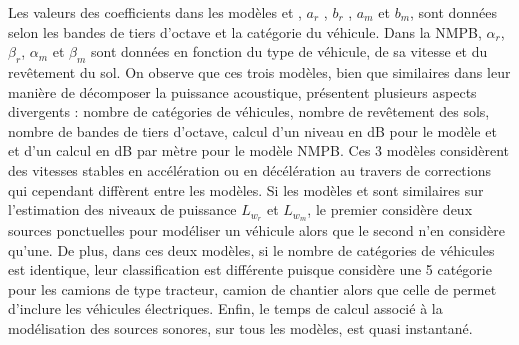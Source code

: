 Les valeurs des coefficients dans les modèles  et , $a_r$ ,  $b_r$ ,  $a_m$  et $b_m$,  sont données selon les bandes de tiers d'octave et la catégorie du véhicule. Dans la NMPB, $\alpha_r$, $\beta_r$, $\alpha_m$ et $\beta_m$ sont données en fonction du type de véhicule, de sa vitesse et du revêtement du sol.
On observe que ces trois modèles, bien que similaires dans leur manière de décomposer la puissance acoustique, présentent plusieurs aspects divergents : nombre de catégories de véhicules, nombre de revêtement des sols, nombre de bandes de tiers d'octave, calcul d'un niveau en dB pour le modèle  et  et d'un calcul en dB par mètre pour le modèle NMPB. Ces 3 modèles considèrent des vitesses stables en accélération ou en décélération au travers de corrections qui cependant diffèrent entre les modèles. Si les modèles  et  sont similaires sur l'estimation des niveaux de puissance $L_{w_r}$ et $L_{w_m}$, le premier considère deux sources ponctuelles pour modéliser un véhicule alors que le second n'en considère qu'une. De plus, dans ces deux modèles, si le nombre de catégories de véhicules est identique, leur classification est différente puisque  considère une 5\ieme{} catégorie pour les camions de type tracteur, camion de chantier alors que celle de  permet d'inclure les véhicules électriques.
Enfin, le temps de calcul associé à la modélisation des sources sonores, sur tous les modèles, est quasi instantané. 

